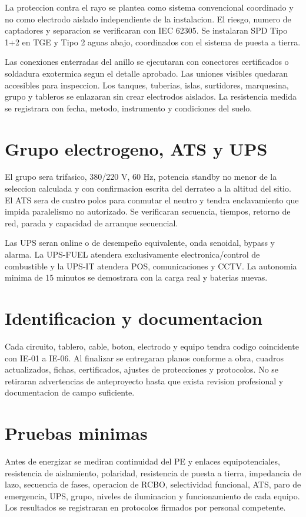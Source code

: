 La proteccion contra el rayo se plantea como sistema convencional coordinado y no como electrodo aislado independiente de la instalacion. El riesgo, numero de captadores y separacion se verificaran con IEC 62305. Se instalaran SPD Tipo 1+2 en TGE y Tipo 2 aguas abajo, coordinados con el sistema de puesta a tierra.

Las conexiones enterradas del anillo se ejecutaran con conectores certificados o
soldadura exotermica segun el detalle aprobado. Las uniones visibles quedaran
accesibles para inspeccion. Los tanques, tuberias, islas, surtidores, marquesina,
grupo y tableros se enlazaran sin crear electrodos aislados. La resistencia medida
se registrara con fecha, metodo, instrumento y condiciones del suelo.

\section{Grupo electrogeno, ATS y UPS}
El grupo sera trifasico, 380/220 V, 60 Hz, potencia standby no menor de la
seleccion calculada y con confirmacion escrita del derrateo a la altitud del sitio.
El ATS sera de cuatro polos para conmutar el neutro y tendra enclavamiento que
impida paralelismo no autorizado. Se verificaran secuencia, tiempos, retorno de
red, parada y capacidad de arranque secuencial.

Las UPS seran online o de desempeño equivalente, onda senoidal, bypass y alarma.
La UPS-FUEL atendera exclusivamente electronica/control de combustible y la
UPS-IT atendera POS, comunicaciones y CCTV. La autonomia minima de 15 minutos se
demostrara con la carga real y baterias nuevas.

\section{Identificacion y documentacion}
Cada circuito, tablero, cable, boton, electrodo y equipo tendra codigo coincidente
con IE-01 a IE-06. Al finalizar se entregaran planos conforme a obra, cuadros
actualizados, fichas, certificados, ajustes de protecciones y protocolos. No se
retiraran advertencias de anteproyecto hasta que exista revision profesional y
documentacion de campo suficiente.

\section{Pruebas minimas}
Antes de energizar se mediran continuidad del PE y enlaces equipotenciales, resistencia de aislamiento, polaridad, resistencia de puesta a tierra, impedancia de lazo, secuencia de fases, operacion de RCBO, selectividad funcional, ATS, paro de emergencia, UPS, grupo, niveles de iluminacion y funcionamiento de cada equipo. Los resultados se registraran en protocolos firmados por personal competente.
